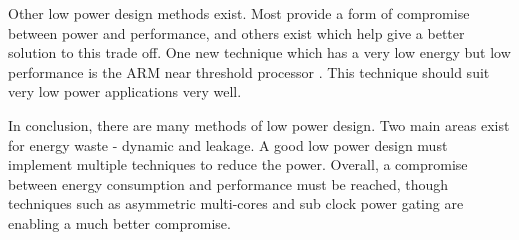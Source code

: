Other low power design methods exist. 
Most provide a form of compromise between power and performance, and others exist which help give a better solution to this trade off. 
One new technique which has a very low energy but low performance is the ARM near threshold processor \cite{arm:nearthresh}. 
This technique should suit very low power applications very well. 

In conclusion, there are many methods of low power design. 
Two main areas exist for energy waste - dynamic and leakage. 
A good low power design must implement multiple techniques to reduce the power. 
Overall, a compromise between energy consumption and performance must be reached, though techniques such as asymmetric multi-cores and sub clock power gating are enabling a much better compromise.

